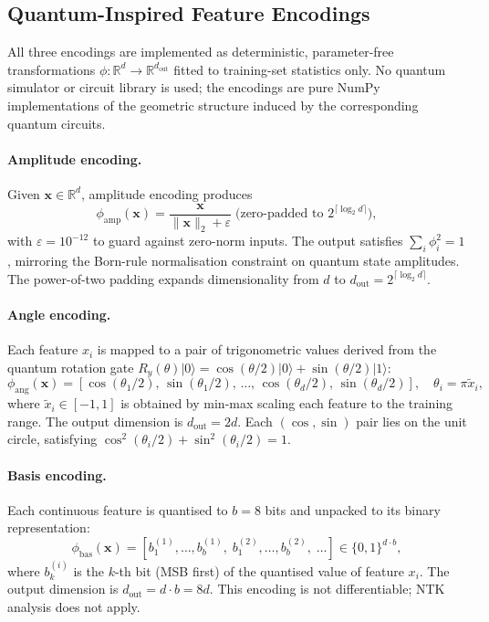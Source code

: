 \documentclass[12pt]{article}
\newcommand{\dout}{d_{\mathrm{out}}}
\newcommand{\Rbb}{\mathbb{R}}
\begin{document}
\subsection{Quantum-Inspired Feature Encodings}
\label{sec:encodings}

All three encodings are implemented as deterministic, parameter-free
transformations $\phi: \Rbb^d \to \Rbb^{\dout}$ fitted to training-set
statistics only.
No quantum simulator or circuit library is used; the encodings are pure NumPy
implementations of the geometric structure induced by the corresponding
quantum circuits.

\paragraph{Amplitude encoding.}
Given $\mathbf{x} \in \Rbb^d$, amplitude encoding produces
\begin{equation}
  \phi_{\mathrm{amp}}(\mathbf{x}) =
    \frac{\mathbf{x}}{\|\mathbf{x}\|_2 + \varepsilon}
    \;\text{(zero-padded to } 2^{\lceil\log_2 d\rceil}\text{)},
  \label{eq:amplitude}
\end{equation}
with $\varepsilon = 10^{-12}$ to guard against zero-norm inputs.
The output satisfies $\sum_i \phi_i^2 = 1$, mirroring the Born-rule
normalisation constraint on quantum state amplitudes.
The power-of-two padding expands dimensionality from $d$ to
$\dout = 2^{\lceil\log_2 d\rceil}$.

\paragraph{Angle encoding.}
Each feature $x_i$ is mapped to a pair of trigonometric values derived from
the quantum rotation gate
$R_y(\theta)|0\rangle = \cos(\theta/2)|0\rangle + \sin(\theta/2)|1\rangle$:
\begin{equation}
  \phi_{\mathrm{ang}}(\mathbf{x}) =
  [\cos(\theta_1/2),\,\sin(\theta_1/2),\,\ldots,\,
   \cos(\theta_d/2),\,\sin(\theta_d/2)],
  \quad \theta_i = \pi \tilde{x}_i,
  \label{eq:angle}
\end{equation}
where $\tilde{x}_i \in [-1,1]$ is obtained by min-max scaling each feature to
the training range.
The output dimension is $\dout = 2d$.
Each $(\cos,\sin)$ pair lies on the unit circle, satisfying
$\cos^2(\theta_i/2) + \sin^2(\theta_i/2) = 1$.

\paragraph{Basis encoding.}
Each continuous feature is quantised to $b = 8$ bits and unpacked to its
binary representation:
\begin{equation}
  \phi_{\mathrm{bas}}(\mathbf{x}) =
    [b_1^{(1)},\ldots,b_b^{(1)},\;
     b_1^{(2)},\ldots,b_b^{(2)},\;\ldots]
    \in \{0,1\}^{d \cdot b},
  \label{eq:basis}
\end{equation}
where $b_k^{(i)}$ is the $k$-th bit (MSB first) of the quantised value of
feature $x_i$.
The output dimension is $\dout = d \cdot b = 8d$.
This encoding is not differentiable; NTK analysis does not apply.
\end{document}
